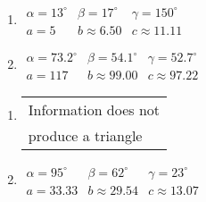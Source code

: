 \documentclass{ximera}
\begin{document}
\begin{multicols}{2}

\begin{enumerate}

\item $\begin{array}{lll}
\alpha = 13^{\circ} & \beta = 17^{\circ} & \gamma = 150^{\circ} \\
a = 5 & b \approx 6.50 & c \approx 11.11 \end{array}$

\item $\begin{array}{lll}
\alpha = 73.2^{\circ} & \beta = 54.1^{\circ} & \gamma = 52.7^{\circ} \\
a = 117 & b \approx 99.00 & c \approx 97.22 \end{array}$

\setcounter{HW}{\value{enumi}}

\end{enumerate}

\end{multicols}

\begin{multicols}{2} 

\begin{enumerate}

\setcounter{enumi}{\value{HW}}

\item \begin{tabular}{l}
Information does not \\
produce a triangle \end{tabular}

\item $\begin{array}{lll}
\alpha = 95^{\circ} & \beta = 62^{\circ} & \gamma = 23^{\circ} \\
a = 33.33 & b \approx 29.54 & c \approx 13.07 \end{array}$

\setcounter{HW}{\value{enumi}}

\end{enumerate}

\end{multicols}
\end{document}
